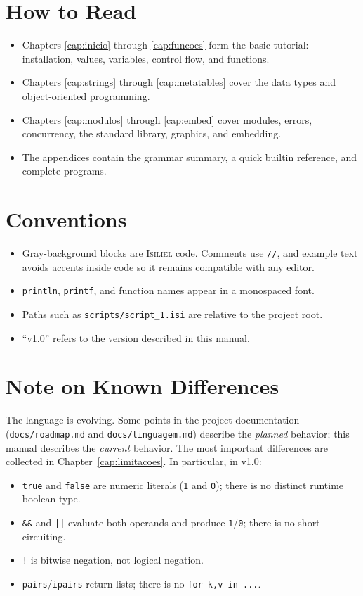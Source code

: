 \documentclass[11pt,a4paper,oneside]{report}
\newcommand{\isiliel}{\textsc{Isiliel}}
\newcommand{\code}[1]{\texttt{#1}}
\newcommand{\file}[1]{\texttt{#1}}
\begin{document}
\section{How to Read}
\begin{itemize}
  \item Chapters \ref{cap:inicio} through \ref{cap:funcoes} form the
        basic tutorial: installation, values, variables, control flow,
        and functions.
  \item Chapters \ref{cap:strings} through \ref{cap:metatables} cover the
        data types and object-oriented programming.
  \item Chapters \ref{cap:modulos} through \ref{cap:embed} cover
        modules, errors, concurrency, the standard library, graphics, and
        embedding.
  \item The appendices contain the grammar summary, a quick builtin
        reference, and complete programs.
\end{itemize}

\section{Conventions}
\begin{itemize}
  \item Gray-background blocks are \isiliel{} code. Comments use
        \code{//}, and example text avoids accents inside code so it
        remains compatible with any editor.
  \item \code{println}, \code{printf}, and function names appear in a
        monospaced font.
  \item Paths such as \file{scripts/script\_1.isi} are relative to the
        project root.
  \item ``v1.0'' refers to the version described in this manual.
\end{itemize}

\section{Note on Known Differences}
The language is evolving. Some points in the project documentation
(\file{docs/roadmap.md} and \file{docs/linguagem.md}) describe the
\emph{planned} behavior; this manual describes the \emph{current}
behavior. The most important differences are collected in
Chapter~\ref{cap:limitacoes}. In particular, in v1.0:
\begin{itemize}
  \item \code{true} and \code{false} are numeric literals (\code{1} and
        \code{0}); there is no distinct runtime boolean type.
  \item \code{\&\&} and \code{||} evaluate both operands and produce
        \code{1}/\code{0}; there is no short-circuiting.
  \item \code{!} is bitwise negation, not logical negation.
  \item \code{pairs}/\code{ipairs} return lists; there is no
        \code{for k,v in ...}.
\end{itemize}
\end{document}
